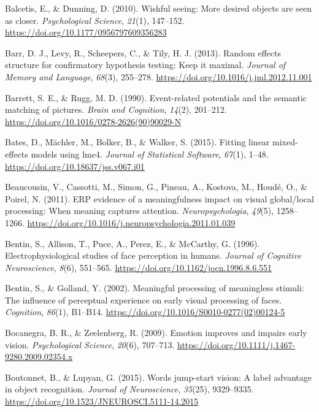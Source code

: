 \documentclass[
  english,
  man,floatsintext]{apa7}
\begin{document}
\leavevmode\hypertarget{ref-balcetis2010}{}%
Balcetis, E., \& Dunning, D. (2010). Wishful seeing: More desired objects are seen as closer. \emph{Psychological Science}, \emph{21}(1), 147--152. \url{https://doi.org/10.1177/0956797609356283}

\leavevmode\hypertarget{ref-barr2013}{}%
Barr, D. J., Levy, R., Scheepers, C., \& Tily, H. J. (2013). Random effects structure for confirmatory hypothesis testing: Keep it maximal. \emph{Journal of Memory and Language}, \emph{68}(3), 255--278. \url{https://doi.org/10.1016/j.jml.2012.11.001}

\leavevmode\hypertarget{ref-barrett1990}{}%
Barrett, S. E., \& Rugg, M. D. (1990). Event-related potentials and the semantic matching of pictures. \emph{Brain and Cognition}, \emph{14}(2), 201--212. \url{https://doi.org/10.1016/0278-2626(90)90029-N}

\leavevmode\hypertarget{ref-R-lme4}{}%
Bates, D., Mächler, M., Bolker, B., \& Walker, S. (2015). Fitting linear mixed-effects models using lme4. \emph{Journal of Statistical Software}, \emph{67}(1), 1--48. \url{https://doi.org/10.18637/jss.v067.i01}

\leavevmode\hypertarget{ref-beaucousin2011}{}%
Beaucousin, V., Cassotti, M., Simon, G., Pineau, A., Kostova, M., Houdé, O., \& Poirel, N. (2011). ERP evidence of a meaningfulness impact on visual global/local processing: When meaning captures attention. \emph{Neuropsychologia}, \emph{49}(5), 1258--1266. \url{https://doi.org/10.1016/j.neuropsychologia.2011.01.039}

\leavevmode\hypertarget{ref-bentin1996}{}%
Bentin, S., Allison, T., Puce, A., Perez, E., \& McCarthy, G. (1996). Electrophysiological studies of face perception in humans. \emph{Journal of Cognitive Neuroscience}, \emph{8}(6), 551--565. \url{https://doi.org/10.1162/jocn.1996.8.6.551}

\leavevmode\hypertarget{ref-bentin2002}{}%
Bentin, S., \& Golland, Y. (2002). Meaningful processing of meaningless stimuli: The influence of perceptual experience on early visual processing of faces. \emph{Cognition}, \emph{86}(1), B1--B14. \url{https://doi.org/10.1016/S0010-0277(02)00124-5}

\leavevmode\hypertarget{ref-bocanegra2009}{}%
Bocanegra, B. R., \& Zeelenberg, R. (2009). Emotion improves and impairs early vision. \emph{Psychological Science}, \emph{20}(6), 707--713. \url{https://doi.org/10.1111/j.1467-9280.2009.02354.x}

\leavevmode\hypertarget{ref-boutonnet2015}{}%
Boutonnet, B., \& Lupyan, G. (2015). Words jump-start vision: A label advantage in object recognition. \emph{Journal of Neuroscience}, \emph{35}(25), 9329--9335. \url{https://doi.org/10.1523/JNEUROSCI.5111-14.2015}
\end{document}
